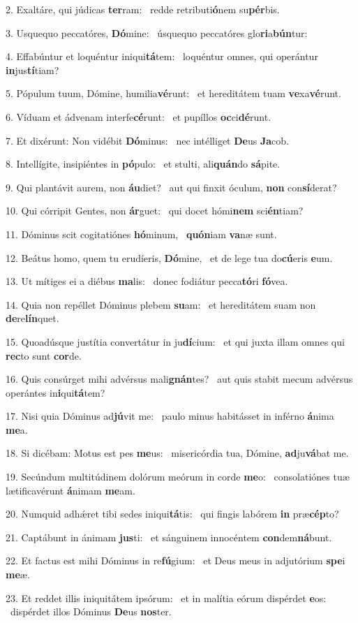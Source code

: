 2. Exaltáre, qui júdicas \textbf{ter}ram: \ast\  redde retributi\textbf{ó}nem su\textbf{pér}bis.\

3. Usquequo peccatóres, \textbf{Dó}mine: \ast\  úsquequo peccatóres glo\textbf{ri}a\textbf{bún}tur:\

4. Effabúntur et loquéntur iniqui\textbf{tá}tem: \ast\  loquéntur omnes, qui operántur \textbf{in}jus\textbf{tí}tiam?\

5. Pópulum tuum, Dómine, humilia\textbf{vé}runt: \ast\  et hereditátem tuam \textbf{ve}xa\textbf{vé}runt.\

6. Víduam et ádvenam interfe\textbf{cé}runt: \ast\  et pupíllos \textbf{oc}ci\textbf{dé}runt.\

7. Et dixérunt: Non vidébit \textbf{Dó}minus: \ast\  nec intélliget \textbf{De}us \textbf{Ja}cob.\

8. Intellígite, insipiéntes in \textbf{pó}pulo: \ast\  et stulti, ali\textbf{quán}do \textbf{sá}pite.\

9. Qui plantávit aurem, non \textbf{áu}diet? \ast\  aut qui finxit óculum, \textbf{non} con\textbf{sí}derat?\

10. Qui córripit Gentes, non \textbf{ár}guet: \ast\  qui docet hómi\textbf{nem} sci\textbf{én}tiam?\

11. Dóminus scit cogitatiónes \textbf{hó}minum, \ast\  \textbf{quón}iam \textbf{va}næ sunt.\

12. Beátus homo, quem tu erudíeris, \textbf{Dó}mine, \ast\  et de lege tua do\textbf{cú}eris \textbf{e}um.\

13. Ut mítiges ei a diébus \textbf{ma}lis: \ast\  donec fodiátur pecca\textbf{tó}ri \textbf{fó}vea.\

14. Quia non repéllet Dóminus plebem \textbf{su}am: \ast\  et hereditátem suam non \textbf{de}re\textbf{lín}quet.\

15. Quoadúsque justítia convertátur in ju\textbf{dí}cium: \ast\  et qui juxta illam omnes qui \textbf{rec}to sunt \textbf{cor}de.\

16. Quis consúrget mihi advérsus mali\textbf{gnán}tes? \ast\  aut quis stabit mecum advérsus operántes in\textbf{i}qui\textbf{tá}tem?\

17. Nisi quia Dóminus ad\textbf{jú}vit me: \ast\  paulo minus habitásset in inférno \textbf{á}nima \textbf{me}a.\

18. Si dicébam: Motus est pes \textbf{me}us: \ast\  misericórdia tua, Dómine, \textbf{ad}ju\textbf{vá}bat me.\

19. Secúndum multitúdinem dolórum meórum in corde \textbf{me}o: \ast\  consolatiónes tuæ lætificavérunt \textbf{á}nimam \textbf{me}am.\

20. Numquid adhǽret tibi sedes iniqui\textbf{tá}tis: \ast\  qui fingis labórem \textbf{in} præ\textbf{cép}to?\

21. Captábunt in ánimam \textbf{jus}ti: \ast\  et sánguinem innocéntem \textbf{con}dem\textbf{ná}bunt.\

22. Et factus est mihi Dóminus in re\textbf{fú}gium: \ast\  et Deus meus in adjutórium \textbf{spe}i \textbf{me}æ.\

23. Et reddet illis iniquitátem ipsórum: \dag\  et in malítia eórum dispérdet \textbf{e}os: \ast\  dispérdet illos Dóminus \textbf{De}us \textbf{nos}ter.\

